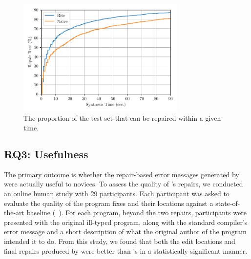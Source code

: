 
\begin{figure}
  \centering
  \includegraphics[height=2.3in]{cdf.pdf}
  \caption{The proportion of the test set that can be repaired within a given time.}
  \label{fig:rite_naive}
\end{figure}

\subsection{RQ3: Usefulness}
\label{sec:eval:useful}

The primary outcome is whether the repair-based
error messages generated by \toolname were actually useful to novices.
%
To assess the quality of \toolname's repairs, we conducted an online human
study with 29 participants.
%
Each participant was asked to evaluate the quality of the program fixes
and their locations against a state-of-the-art baseline
(\seminal ~\citep{Lerner2007-dt}).
%
For each program, beyond the two repairs, participants were presented
with the original ill-typed program, along with the standard \ocaml
compiler's error message and a short description of what the original
author of the program intended it to do.
%
From this study, we found that both the edit locations and final
repairs produced by \toolname were better than
\seminal's in a statistically significant manner.

